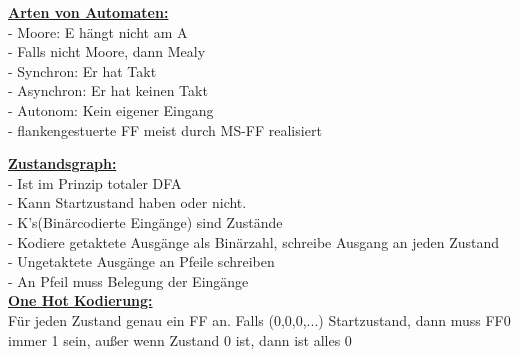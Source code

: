 \documentclass[11pt]{article}
\begin{document}
\begin{minipage}{0.33\textwidth}
\vspace{-4cm}
\underline{\textbf{Arten von Automaten:}}\\
- Moore: E hängt nicht am A\\
- Falls nicht Moore, dann Mealy\\
- Synchron: Er hat Takt\\
- Asynchron: Er hat keinen Takt\\
- Autonom: Kein eigener Eingang\\
- flankengestuerte FF meist durch MS-FF realisiert

\vspace{7cm}
\underline{\textbf{Zustandsgraph:}}\\
- Ist im Prinzip totaler DFA\\
- Kann Startzustand haben oder nicht.\\
- K's(Binärcodierte Eingänge) sind Zustände\\
- Kodiere getaktete Ausgänge als Binärzahl, schreibe Ausgang an jeden Zustand\\
- Ungetaktete Ausgänge an Pfeile schreiben\\
- An Pfeil muss Belegung der Eingänge\\

\underline{\textbf{One Hot Kodierung:}}\\
Für jeden Zustand genau ein FF an. Falls (0,0,0,...) Startzustand, dann muss FF0 immer 1 sein, außer wenn Zustand 0 ist, dann ist alles 0
\end{minipage}%
\end{document}
